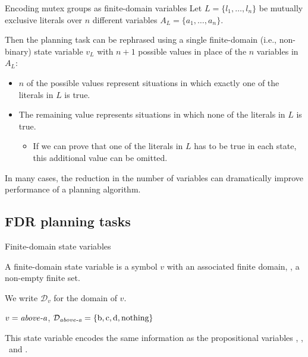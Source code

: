 \documentclass{gkibeamer}
\begin{document}
\begin{frame}{Encoding mutex groups as finite-domain variables}
  Let $L = \{l_1, \dots, l_n\}$ be mutually exclusive literals over
  $n$ different variables $A_L = \{a_1, \dots, a_n\}$.

  \smallskip
    
  Then the planning task can be rephrased using a single
  \alert{finite-domain} (i.e., non-binary) state variable $v_L$ with
  $n + 1$ possible values in place of the $n$ variables in $A_L$:
  \begin{itemize}
  \item $n$ of the possible values represent situations in which
    \alert{exactly one} of the literals in $L$ is true.
  \item The remaining value represents situations in which
    \alert{none of the literals} in $L$ is true.
    \begin{itemize}
    \item {} If we can prove that one of the literals in
      $L$ has to be true in each state, this additional value can be
      omitted.
    \end{itemize}
  \end{itemize}

  In many cases, the reduction in the number of variables can
  dramatically improve performance of a planning algorithm.
\end{frame}

\subsection{FDR planning tasks}

\begin{frame}{Finite-domain state variables}
  \begin{definition}
    A \alert{finite-domain state variable} is a symbol $v$ with an
    associated \alert{finite domain}, \ie, a non-empty finite set.

    \smallskip

    We write $\mathcal D_v$ for the domain of $v$.
  \end{definition}

  \begin{example}
    $v = \textit{above-a}$, $\mathcal D_{\textit{above-a}} =
    \{\text{b}, \text{c}, \text{d}, \text{nothing}\}$

    \smallskip

    This state variable encodes the same information as the
    propositional variables \BONA, \CONA, \DONA\ and \CLEARA.
  \end{example}
\end{frame}
\end{document}
